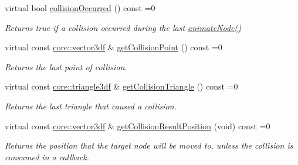\begin{DoxyCompactItemize}
virtual bool \hyperlink{classirr_1_1scene_1_1ISceneNodeAnimatorCollisionResponse_a8bb04bc4d7de2203879a8392d024f466}{collision\+Occurred} () const =0
\begin{DoxyCompactList}\small\item\em Returns true if a collision occurred during the last \hyperlink{classirr_1_1scene_1_1ISceneNodeAnimator_ab2170d133db16de148d0f6841c06bc84}{animate\+Node()} \end{DoxyCompactList}\item 
\mbox{\label{classirr_1_1scene_1_1ISceneNodeAnimatorCollisionResponse_acb39b68d18f721960ac73dc158968479}} 
virtual const \hyperlink{namespaceirr_1_1core_ae6e2b2a6c552833ebbd5b7463d03586b}{core\+::vector3df} \& \hyperlink{classirr_1_1scene_1_1ISceneNodeAnimatorCollisionResponse_acb39b68d18f721960ac73dc158968479}{get\+Collision\+Point} () const =0
\begin{DoxyCompactList}\small\item\em Returns the last point of collision. \end{DoxyCompactList}\item 
\mbox{\label{classirr_1_1scene_1_1ISceneNodeAnimatorCollisionResponse_abb9d0576446a64e9944ef15a04722591}} 
virtual const \hyperlink{namespaceirr_1_1core_a8983bda2678a7a67d97bf3c7be6c31c7}{core\+::triangle3df} \& \hyperlink{classirr_1_1scene_1_1ISceneNodeAnimatorCollisionResponse_abb9d0576446a64e9944ef15a04722591}{get\+Collision\+Triangle} () const =0
\begin{DoxyCompactList}\small\item\em Returns the last triangle that caused a collision. \end{DoxyCompactList}\item 
virtual const \hyperlink{namespaceirr_1_1core_ae6e2b2a6c552833ebbd5b7463d03586b}{core\+::vector3df} \& \hyperlink{classirr_1_1scene_1_1ISceneNodeAnimatorCollisionResponse_a788542083dda874c63e278891535a9f4}{get\+Collision\+Result\+Position} (void) const =0
\begin{DoxyCompactList}\small\item\em Returns the position that the target node will be moved to, unless the collision is consumed in a callback. \end{DoxyCompactList}\item 
\mbox{\label{classirr_1_1scene_1_1ISceneNodeAnimatorCollisionResponse_a5a975ddf3d776d6bb4c6d44c36cc74fd}} 

\end{DoxyCompactItemize}
